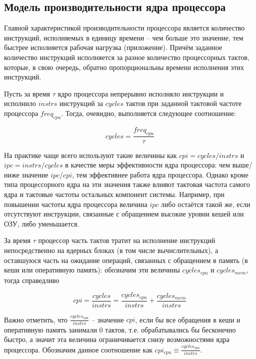 \subsection{Модель производительности ядра процессора} \label{model_chapter}

    Главной характеристикой производительности процессора является количество инструкций,
    исполняемых в единицу времени -- чем больше это значение, тем быстрее исполняется рабочая
    нагрузка (приложение). Причём заданное количество инструкций исполняется за разное количество
    процессорных тактов, которые, в свою очередь, обратно пропорциональны времени исполнения
    этих инструкций.

    Пусть за время $\tau$ ядро процессора непрерывно исполняло инструкции и исполнило $instrs$
    инструкций за $cycles$ тактов при заданной тактовой частоте процессора $freq_{cpu}$.
    Тогда, очевидно, выполняется следующее соотношение:

    \begin{equation} \label{cycles_base}
        cycles = \frac{freq_{cpu}}{\tau}
    \end{equation}

    На практике чаще всего используют такие величины как $cpi = cycles / instrs$ и
    $ipc = instrs / cycles$ в качестве меры эффективности ядра процессора: чем выше/ниже значение
    $ipc$/$cpi$, тем эффективнее работа ядра процессора. Однако кроме типа процессорного ядра
    на эти значения также влияют тактовая частота самого ядра и тактовые частоты остальных компонент
    системы. Например, при повышении частоты ядра процессора величина $ipc$ либо остаётся такой же,
    если отсутствуют инструкции, связанные с обращением высокие уровни кешей или ОЗУ, либо уменьшается.

    За время $\tau$ процессор часть тактов тратит на исполнение инструкций непосредственно на
    ядерных блоках (в том числе вычислительных), а оставшуюся часть на ожидание операций,
    связанных с обращением в память (в кеши или оперативную память): обозначим эти величины
    $cycles_{cpu}$ и $cycles_{mem}$, тогда справедливо

    \begin{equation}
        cpi = \frac{cycles}{instrs} = \frac{cycles_{cpu}}{instrs} + \frac{cycles_{mem}}{instrs}
    \end{equation}

    Важно отметить, что $\frac{cycles_{cpu}}{instrs}$ -- значение $cpi$, если бы все обращения
    в кеши и оперативную память занимали 0 тактов, т.е. обрабатывались бы бесконечно быстро, а значит
    эта величина ограничивается снизу возможностями ядра процессора. Обозначим данное соотношение
    как $cpi_{cpu} \equiv \frac{cycles_{cpu}}{instrs}$.

